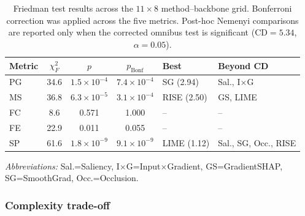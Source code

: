 \documentclass[final,5p,times,twocolumn]{elsarticle}
\begin{document}
\begin{table}[!t]
\centering
\caption{Friedman test results across the $11\times8$ method--backbone grid. Bonferroni correction was applied across the five metrics. Post-hoc Nemenyi comparisons are reported only when the corrected omnibus test is significant ($\mathrm{CD}=5.34$, $\alpha=0.05$).}
\label{tab:friedman}
\scriptsize
\setlength{\tabcolsep}{3pt}
\renewcommand{\arraystretch}{1.05}

\begin{tabular}{lcccll}
\toprule
Metric & $\chi^2_F$ & $p$ & $p_{\mathrm{Bonf}}$ & Best & Beyond CD \\
\midrule
PG & 34.6 & $1.5\times10^{-4}$ & $7.4\times10^{-4}$ & SG (2.94) & Sal., I$\times$G \\
MS & 36.8 & $6.3\times10^{-5}$ & $3.1\times10^{-4}$ & RISE (2.50) & GS, LIME \\
FC & 8.6 & 0.571 & 1.000 & -- & -- \\
FE & 22.9 & 0.011 & 0.055 & -- & -- \\
SP & 61.6 & $1.8\times10^{-9}$ & $9.1\times10^{-9}$ & LIME (1.12) & Sal., SG, Occ., RISE \\
\bottomrule
\end{tabular}

\vspace{2pt}
\raggedright
\footnotesize
\textit{Abbreviations:} Sal.=Saliency, I$\times$G=Input$\times$Gradient, GS=GradientSHAP, SG=SmoothGrad, Occ.=Occlusion.
\end{table}



\subsubsection{Complexity trade-off}
\end{document}
